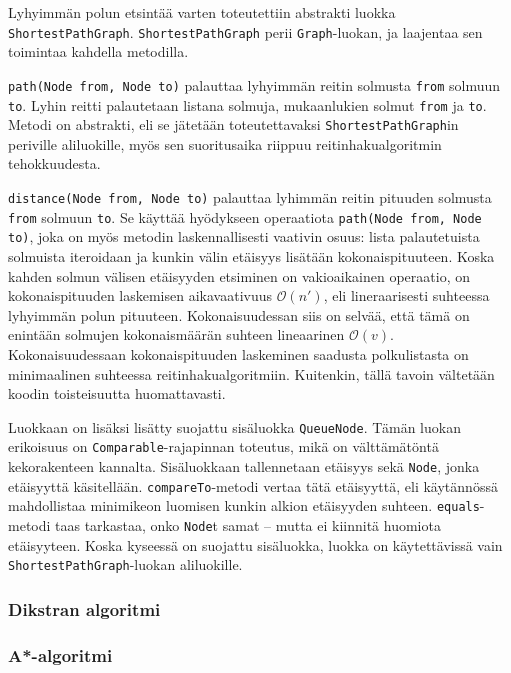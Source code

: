 \documentclass[10pt,a4paper]{article}
\begin{document}
Lyhyimmän polun etsintää varten toteutettiin abstrakti luokka \texttt{ShortestPathGraph}. \texttt{ShortestPathGraph} perii \texttt{Graph}-luokan, ja laajentaa sen toimintaa kahdella metodilla.

\texttt{path(Node from, Node to)} palauttaa lyhyimmän reitin solmusta \texttt{from} solmuun \texttt{to}. Lyhin reitti palautetaan listana solmuja, mukaanlukien solmut \texttt{from} ja \texttt{to}. Metodi on abstrakti, eli se jätetään toteutettavaksi \texttt{ShortestPathGraph}in  periville aliluokille, myös sen suoritusaika riippuu reitinhakualgoritmin tehokkuudesta.

\texttt{distance(Node from, Node to)} palauttaa lyhimmän reitin pituuden solmusta \texttt{from} solmuun \texttt{to}. Se käyttää hyödykseen operaatiota \texttt{path(Node from, Node to)}, joka on myös metodin laskennallisesti vaativin osuus: lista palautetuista solmuista iteroidaan ja kunkin välin etäisyys lisätään kokonaispituuteen. Koska kahden solmun välisen etäisyyden etsiminen on vakioaikainen operaatio, on kokonaispituuden laskemisen aikavaativuus $\mathcal{O}(n')$, eli lineraarisesti suhteessa lyhyimmän polun pituuteen. Kokonaisuudessan siis on selvää, että tämä on enintään solmujen kokonaismäärän suhteen lineaarinen $\mathcal{O}(v)$. Kokonaisuudessaan kokonaispituuden laskeminen saadusta polkulistasta on minimaalinen suhteessa reitinhakualgoritmiin. Kuitenkin, tällä tavoin vältetään koodin toisteisuutta huomattavasti.

Luokkaan on lisäksi lisätty suojattu sisäluokka \texttt{QueueNode}. Tämän luokan erikoisuus on \texttt{Comparable}-rajapinnan toteutus, mikä on välttämätöntä kekorakenteen kannalta. Sisäluokkaan tallennetaan etäisyys sekä \texttt{Node}, jonka etäisyyttä käsitellään. \texttt{compareTo}-metodi vertaa tätä etäisyyttä, eli käytännössä mahdollistaa minimikeon luomisen kunkin alkion etäisyyden suhteen. \texttt{equals}-metodi taas tarkastaa, onko \texttt{Node}t samat -- mutta ei kiinnitä huomiota etäisyyteen. Koska kyseessä on suojattu sisäluokka, luokka on käytettävissä vain \texttt{ShortestPathGraph}-luokan aliluokille.

\subsubsection{Dikstran algoritmi}

\subsubsection{A*-algoritmi}
\end{document}
